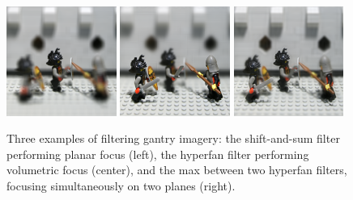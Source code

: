 \documentclass[onecolumn]{article}
\begin{document}
\begin{figure}
	\centering
	\includegraphics[width=0.32\textwidth]{Figs/Lego512_ShiftSum_n0.6}
	\includegraphics[width=0.32\textwidth]{Figs/Lego512_Hyperfan_n0.6_2}
	\includegraphics[width=0.32\textwidth]{Figs/Lego512_Hyperfan_n0.8_0.8}
	\caption{Three examples of filtering gantry imagery: the shift-and-sum filter performing planar focus (left), the hyperfan filter performing volumetric focus (center), and the max between two hyperfan filters, focusing simultaneously on two planes (right).}
	\label{fig_ExampleFilterOutputGantry}
\end{figure}
\end{document}
